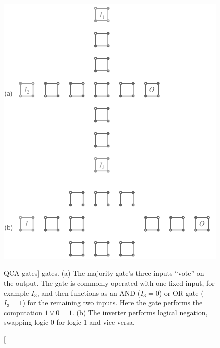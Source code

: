 \begin{figure}
  \center
  \includegraphics{gates}
  \caption
[QCA gates]
{
\label{fig:gates}
 gates. (a) The majority gate's three inputs ``vote'' on the output. The gate
is commonly operated with one fixed input, for example $I_3$, and then functions
as an AND ($I_3 = 0$) or OR gate ($I_3 = 1$) for the remaining two inputs. Here
the gate performs the computation $1 \lor 0 = 1$. (b) The inverter performs
logical negation, swapping logic 0 for logic 1 and vice versa.
}
\end{figure}

